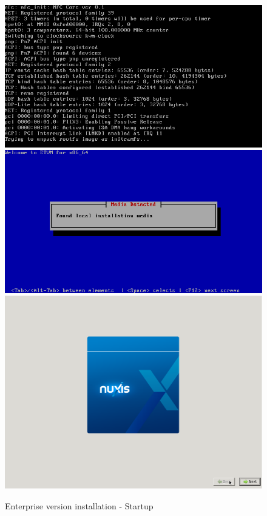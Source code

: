 \begin{figure}[H]
	\begin{center}
	\includegraphics[scale=0.3]{screenshots/install/nuxis/boot_installer.png}
	\includegraphics[scale=0.3]{screenshots/install/nuxis/load_installer_01.png}
	\includegraphics[scale=0.3]{screenshots/install/nuxis/wizard_install_01.png}
    \caption{Enterprise version installation - Startup}
	\label{fig:installation_enterprise_02}
	\end{center}
\end{figure}

